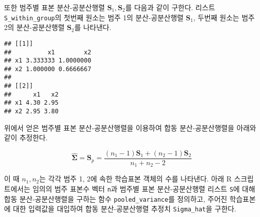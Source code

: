 \documentclass[]{book}
\newenvironment{Shaded}{\begin{snugshade}}{\end{snugshade}}
\newcommand{\ControlFlowTok}[1]{\textcolor[rgb]{0.13,0.29,0.53}{\textbf{#1}}}
\newcommand{\KeywordTok}[1]{\textcolor[rgb]{0.13,0.29,0.53}{\textbf{#1}}}
\newcommand{\NormalTok}[1]{#1}
\newcommand{\OperatorTok}[1]{\textcolor[rgb]{0.81,0.36,0.00}{\textbf{#1}}}
\newcommand{\StringTok}[1]{\textcolor[rgb]{0.31,0.60,0.02}{#1}}
\begin{document}
또한 범주별 표본 분산-공분산행렬 \(\mathbf{S}_1, \mathbf{S}_2\)를 다음과 같이 구한다. 리스트 \texttt{S\_within\_group}의 첫번째 원소는 범주 1의 분산-공분산행렬 \(\mathbf{S}_1\), 두번째 원소는 범주 2의 분산-공분산행렬 \(\mathbf{S}_2\)를 나타낸다.

\begin{Shaded}
\end{Shaded}

\begin{verbatim}
## [[1]]
##          x1        x2
## x1 3.333333 1.0000000
## x2 1.000000 0.6666667
## 
## [[2]]
##      x1   x2
## x1 4.30 2.95
## x2 2.95 3.80
\end{verbatim}

위에서 얻은 범주별 표본 분산-공분산행렬을 이용하여 합동 분산-공분산행렬을 아래와 같이 추정한다.

\begin{equation*}
\hat{\boldsymbol\Sigma} = \mathbf{S}_p = \frac{(n_1 - 1)\mathbf{S}_1 + (n_2 - 1)\mathbf{S}_2}{n_1 + n_2 - 2}
\end{equation*}

이 때 \(n_1, n_2\)는 각각 범주 1, 2에 속한 학습표본 객체의 수를 나타낸다. 아래 R 스크립트에서는 임의의 범주 표본수 벡터 \texttt{n}과 범주별 표본 분산-공분산행렬 리스트 \texttt{S}에 대해 합동 분산-공분산행렬을 구하는 함수 \texttt{pooled\_variance}를 정의하고, 주어진 학습표본에 대한 입력값을 대입하여 합동 분산-공분산행렬 추정치 \texttt{Sigma\_hat}을 구한다.
\end{document}
